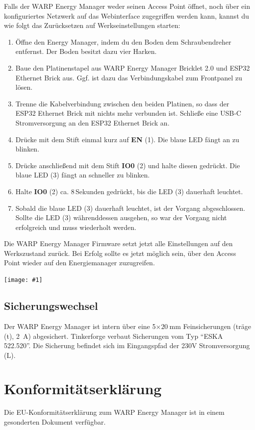 \documentclass[a4paper,10pt]{article}
\newcommand{\gfx}[1]{\texttt{[image: \#1]}}
\begin{document}
\begin{multicols*}{2}
	Falls der WARP Energy Manager weder seinen Access Point öffnet, noch über ein konfiguriertes Netzwerk auf das Webinterface zugegriffen werden kann,
	kannst du wie folgt das Zurücksetzen auf Werkseinstellungen starten:
	\begin{enumerate}
	 \item Öffne den Energy Manager, indem du den Boden dem Schraubendreher entfernst. Der Boden besitzt dazu vier Harken.
     \item Baue den Platinenstapel aus WARP Energy Manager Bricklet 2.0 und ESP32 Ethernet Brick aus. Ggf. ist dazu das Verbindungskabel zum Frontpanel zu lösen.
     \item Trenne die Kabelverbindung zwischen den beiden Platinen, so dass der ESP32 Ethernet Brick mit nichts mehr verbunden ist. Schließe eine USB-C Stromversorgung an den ESP32 Ethernet Brick an.
	 \item Drücke mit dem Stift einmal kurz auf \textbf{EN} (1). Die blaue LED fängt an zu blinken.
	 \item Drücke anschließend mit dem Stift \textbf{IO0} (2) und halte diesen gedrückt. Die blaue LED (3) fängt an schneller zu blinken.
	 \item Halte \textbf{IO0} (2) ca. 8\,Sekunden gedrückt, bis die LED (3) dauerhaft leuchtet.
	 \item Sobald die blaue LED (3) dauerhaft leuchtet, ist der Vorgang abgeschlossen. Sollte die LED (3) währenddessen ausgehen, so war der Vorgang nicht erfolgreich und muss wiederholt werden.
	\end{enumerate}
	Die WARP Energy Manager Firmware setzt jetzt alle Einstellungen auf den Werkszustand zurück. Bei Erfolg sollte es jetzt möglich sein, über den Access Point wieder auf den Energiemanager zuzugreifen.

	\gfx{./img/resized/factory_reset_2}

	\subsection{Sicherungswechsel}
	Der WARP Energy Manager ist intern über eine 5$\times\SI{20}{\milli\meter}$ Feinsicherungen (träge (t), \SI{2}{\ampere}) abgesichert.
	Tinkerforge verbaut Sicherungen vom Typ \enquote{ESKA 522.520}. Die
	Sicherung befindet sich im Eingangspfad der 230V Stromversorgung (L).

	\section{Konformitätserklärung}
	Die EU-Konformitätserklärung zum WARP Energy Manager ist in einem gesonderten Dokument verfügbar.


\end{multicols*}
\end{document}
